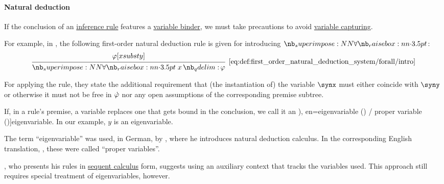 \paragraph{Natural deduction}

\begin{concept}\label{con:eigenvariable}\mimprovised
  If the conclusion of an \hyperref[def:inference_rule]{inference rule} features a \hyperref[con:variable_binding]{variable binder}, we must take precautions to avoid \hyperref[rem:renaming_substitution_rules]{variable capturing}.

  For example, in \cite[36]{TroelstraSchwichtenberg2000BasicProofTheory}, the following first-order natural deduction rule is given for introducing \( \synforall \):
  \begin{equation*}
    \begin{prooftree}
      \hypo{ \varphi[x subst y] }
      \infer1[\ref{eq:def:first_order_natural_deduction_system/forall/intro}]{ \qforall x \varphi }.
    \end{prooftree}
  \end{equation*}

  For applying the rule, they state the additional requirement that (the instantiation of) the variable \( \synx \) must either coincide with \( \syny \) or otherwise it must not be free in \( \dot{\varphi} \) nor any open assumptions of the corresponding premise subtree.

  If, in a rule's premise, a variable replaces one that gets bound in the conclusion, we call it an \term[ru=собственная переменная (\cite[101]{Герасимов2011Вычислимость}), en=eigenvariable (\cite[\S 5.1.10]{Mimram2020ProgramEqualsProof}) / proper variable (\cite[38]{TroelstraSchwichtenberg2000BasicProofTheory})]{eigenvariable}. In our example, \( y \) is an eigenvariable.

\end{concept}
\begin{comments}
  \item The term \enquote{eigenvariable} was used, in German, by , where he introduces natural deduction calculus. In the corresponding English translation, , these were called \enquote{proper variables}.

  \item {}, who presents his rules in \hyperref[rem:sequent_calculus]{sequent calculus} form, suggests using an auxiliary context that tracks the variables used. This approach still requires special treatment of eigenvariables, however.
\end{comments}

